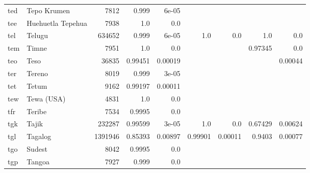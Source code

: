 \documentclass[11pt]{article}
\begin{document}
\begin{table*}[h]
{\begin{tabular}{llrrrrrrr}
ted         & Tepo Krumen         & 7812         & 0.999         & 6e-05         &          &          &          &          \\

tee         & Huehuetla Tepehua         & 7938         & 1.0         & 0.0         &          &          &          &          \\

tel         & Telugu         & 634652         & 0.999         & 6e-05         & 1.0         & 0.0         & 1.0         & 0.0         \\

tem         & Timne         & 7951         & 1.0         & 0.0         &          &          & 0.97345         & 0.0         \\

teo         & Teso         & 36835         & 0.99451         & 0.00019         &          &          &          & 0.00044         \\

ter         & Tereno         & 8019         & 0.999         & 3e-05         &          &          &          &          \\

tet         & Tetum         & 9162         & 0.99197         & 0.00011         &          &          &          &          \\

tew         & Tewa (USA)         & 4831         & 1.0         & 0.0         &          &          &          &          \\

tfr         & Teribe         & 7534         & 0.9995         & 0.0         &          &          &          &          \\

tgk         & Tajik         & 232287         & 0.99599         & 3e-05         & 1.0         & 0.0         & 0.67429         & 0.00624         \\

tgl         & Tagalog         & 1391946         & 0.85393         & 0.00897         & 0.99901         & 0.00011         & 0.9403         & 0.00077         \\

tgo         & Sudest         & 8042         & 0.9995         & 0.0         &          &          &          &          \\

tgp         & Tangoa         & 7927         & 0.999         & 0.0         &          &          &          &          \\


\end{tabular}}
\end{table*}
\end{document}
